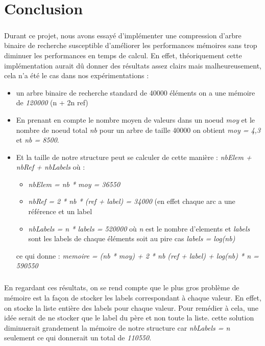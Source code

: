 \chapter{Conclusion}

\paragraph{}
Durant ce projet, nous avons essayé d'implémenter une compression d'arbre binaire de recherche susceptible d'améliorer les performances mémoires sans trop diminuer les performances en temps de calcul.
En effet, théoriquement cette implémentation aurait dû donner des résultats assez clairs mais malheureusement, cela n'a été le cas dans nos expérimentations :
\begin{itemize}
    \item un arbre binaire de recherche standard de 40000 éléments on a une mémoire de \textit{120000} (n + 2n ref)
    \item En prenant en compte le nombre moyen de valeurs dans un noeud \textit{moy} et le nombre de noeud total \textit{nb} pour un arbre de taille 40000 on obtient \textit{moy = 4,3} et \textit{nb = 8500}.
    \item Et la taille de notre structure peut se calculer de cette manière : \textit{nbElem + nbRef + nbLabels } où :
    \begin{itemize}
        \item \textit{nbElem = nb * moy = 36550}
        \item \textit{nbRef = 2 * nb * (ref + label) = 34000} (en effet chaque arc a une référence et un label
        \item \textit{nbLabels = n * labels = 520000} où \textit{n} est le nombre d'elements et \textit{labels} sont les labels de chaque éléments soit au pire cas \textit{labels = log(nb)}
    \end{itemize}
    ce qui donne : \textit{memoire = (nb * moy) + 2 * nb (ref + label)  + log(nb) * n = 590550}
\end{itemize}
\paragraph{}
En regardant ces résultats, on se rend compte que le plus gros problème de mémoire est la façon de stocker les labels correspondant à chaque valeur. En effet, on stocke la liste entière des labels pour chaque valeur. 
Pour remédier à cela, une idée serait de ne stocker que le label du père et non toute la liste. cette solution diminuerait grandement la mémoire de notre structure car \textit{nbLabels = n} seulement ce qui donnerait un total de \textit{110550}. 